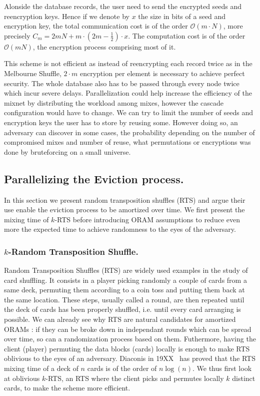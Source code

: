 \documentclass[english,oneside,twocolumn]{article}
\begin{document}
Alonside the database records, the user need to send the encrypted seeds and reencryption keys. Hence if we denote by $x$ the size in bits of a seed and encryption key, the total communication cost is of the order $\mathcal{O}\left ( m\cdot N \right )$, more precisely $C_m=2mN + m\cdot(2m-\frac{1}{2})\cdot x$.
The computation cost is of the order $\mathcal{O}\left(mN\right)$, the encryption process comprising most of it.

This scheme is not efficient as instead of reencrypting each record twice as in the Melbourne Shuffle, $2\cdot m$ encryption per element is necessary to achieve perfect security. The whole database also has to be passed through every node twice which incur severe delays. Parallelization could help increase the efficiency of the mixnet by distributing the workload among mixes, however the cascade configuration would have to change.
We can try to limit the number of seeds and encryption keys the user has to store by reusing some. However doing so, an adversary can discover in some cases, the probability depending on the number of compromised mixes and number of reuse, what permutations or encryptions was done by bruteforcing on a small universe.

\subsection{Parallelizing the Eviction process.}
In this section we present random transposition shuffles (RTS) and argue their use enable the eviction process to be amortized over time.
We first present the mixing time of $k$-RTS before introducing ORAM assumptions to reduce even more the expected time to achieve randomness to the eyes of the adversary.

\subsubsection{$k$-Random Transposition Shuffle.}
Random Transposition Shuffles (RTS) are widely used examples in the study of card shuffling. It consists in a player picking randomly a couple of cards from a same deck, permuting them according to a coin toss and putting them back at the same location.
These steps, usually called a round, are then repeated until the deck of cards has been properly shuffled, i.e. until every card arranging is possible.
We can already see why RTS are natural candidates for amortized ORAMs : if they can be broke down in independant rounds which can be spread over time, so can a randomization process based on them. Futhermore, having the client (player) permuting the data blocks (cards) locally is enough to make RTS oblivious to the eyes of an adversary.
Diaconis in 19XX~\cite{} has proved that the RTS mixing time of a deck of $n$ cards is of the order of $n\log(n)$. We thus first look at oblivious $k$-RTS, an RTS where the client picks and permutes locally $k$ distinct cards, to make the scheme more efficient.
\end{document}
